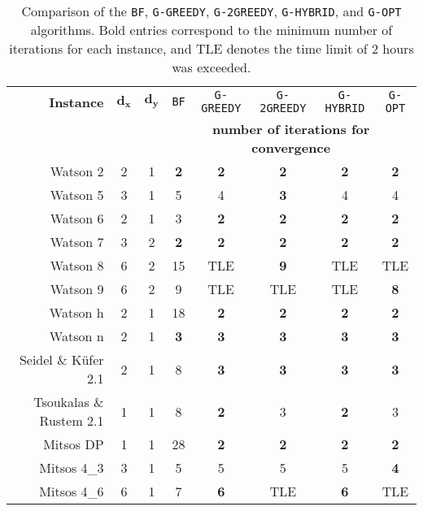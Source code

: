 \documentclass{article}
\newcommand{\1}[1]{\mathds{1}\left[#1\right]}
\begin{document}
\begin{table}[t]
\centering
\begin{tabular}{rccccccc}
\hline
\textbf{Instance}     & $\mathbf{d_x}$ & $\mathbf{d_y}$ &  \texttt{BF}            & \texttt{G-GREEDY}        & \texttt{G-2GREEDY}       & \texttt{G-HYBRID}    & \texttt{G-OPT}   \\
            &    &    &  \multicolumn{5}{c}{\textbf{number of iterations for convergence}} \\ \hline
Watson 2    & 2 & 1  & \textbf{2}                 & \textbf{2}            & \textbf{2}           & \textbf{2}             & \textbf{2}  \\
Watson 5    &  3 &  1 &      5       &  4 &  \textbf{3}  &    4      & 4   \\
Watson 6    & 2  & 1  & 3             & \textbf{2}            & \textbf{2}           & \textbf{2}             & \textbf{2}  \\
Watson 7    & 3 & 2  & \textbf{2}                 & \textbf{2}            & \textbf{2}           & \textbf{2}             & \textbf{2}  \\
Watson 8    &  6 &  2 &      15       &   TLE   & \textbf{9} &    TLE  &  TLE \\
Watson 9    &  6 &  2 &      {9}       &  TLE   & TLE &  TLE    & \textbf{8}   \\
Watson h   & 2  & 1  & 18            & \textbf{2}    & \textbf{2} & \textbf{2} & \textbf{2}\\
Watson n    &  2&  1 &      \textbf{3}       &  \textbf{3}  &  \textbf{3}   &    \textbf{3}      & \textbf{3}  \\
Seidel \& K{\"u}fer 2.1      & 2  & 1  & 8            & \textbf{3}            & \textbf{3}           & \textbf{3}  & \textbf{3}             \\
Tsoukalas \& Rustem 2.1        & 1  & 1   & 8      &  \textbf{2} & 3   & \textbf{2}  & 3 \\
Mitsos DP   & 1  & 1  & 28            & \textbf{2}             & \textbf{2}            & \textbf{2}    & \textbf{2}              \\


Mitsos 4\_3 & 3  & 1  & 5            &      5   & 5    &  5 & \textbf{4} \\
Mitsos 4\_6 & 6  & 1  & 7            &         \textbf{6}    &  TLE   &  \textbf{6} & TLE \\

\hline
\end{tabular}
\caption{
Comparison of the \texttt{BF}, \texttt{G-GREEDY}, \texttt{G-2GREEDY}, \texttt{G-HYBRID}, and \texttt{G-OPT} algorithms.
Bold entries correspond to the minimum number of iterations for each instance, and TLE denotes the time limit of $2$ hours was exceeded.
}
\label{tab:resul-simple-probs-sens}
\end{table}
\end{document}
